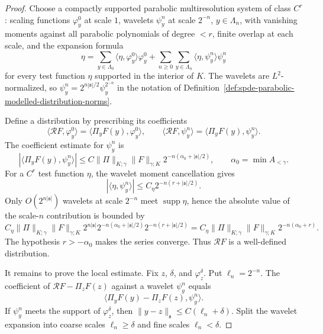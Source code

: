 \begin{proof}
Choose a compactly supported parabolic multiresolution system of class
\(C^r\): scaling functions \(\varphi_y^0\) at scale \(1\), wavelets
\(\psi_y^n\) at scale \(2^{-n}\), \(y\in\Lambda_n\), with vanishing moments
against all parabolic polynomials of degree \(<r\), finite overlap at each
scale, and the expansion formula
\[
  \eta
  =
  \sum_{y\in\Lambda_0}\langle\eta,\varphi_y^0\rangle\varphi_y^0
  +
  \sum_{n\geq0}\sum_{y\in\Lambda_n}
  \langle\eta,\psi_y^n\rangle\psi_y^n
\]
for every test function \(\eta\) supported in the interior of \(K\).  The
wavelets are \(L^2\)-normalized, so
\(\psi_y^n=2^{n|\mathfrak s|/2}\psi_y^{2^{-n}}\) in the notation of
Definition~\ref{def:spde-parabolic-modelled-distribution-norms}.

Define a distribution by prescribing its coefficients
\[
  \langle\mathcal RF,\varphi_y^0\rangle
  =
  \langle\Pi_yF(y),\varphi_y^0\rangle,\qquad
  \langle\mathcal RF,\psi_y^n\rangle
  =
  \langle\Pi_yF(y),\psi_y^n\rangle .
\]
The coefficient estimate for \(\psi_y^n\) is
\[
  |\langle\Pi_yF(y),\psi_y^n\rangle|
  \leq
  C\|\Pi\|_{K;\gamma}\|F\|_{\gamma;K}
  2^{-n(\alpha_0+|\mathfrak s|/2)},
  \qquad
  \alpha_0=\min A_{<\gamma}.
\]
For a \(C^r\) test function \(\eta\), the wavelet moment cancellation gives
\[
  |\langle\eta,\psi_y^n\rangle|
  \leq
  C_\eta 2^{-n(r+|\mathfrak s|/2)} .
\]
Only \(O(2^{n|\mathfrak s|})\) wavelets at scale \(2^{-n}\) meet
\(\operatorname{supp}\eta\), hence the absolute value of the scale-\(n\)
contribution is bounded by
\[
  C_\eta\|\Pi\|_{K;\gamma}\|F\|_{\gamma;K}
  2^{n|\mathfrak s|}
  2^{-n(\alpha_0+|\mathfrak s|/2)}
  2^{-n(r+|\mathfrak s|/2)}
  =
  C_\eta\|\Pi\|_{K;\gamma}\|F\|_{\gamma;K}2^{-n(\alpha_0+r)} .
\]
The hypothesis \(r>-\alpha_0\) makes the series converge.  Thus
\(\mathcal RF\) is a well-defined distribution.

It remains to prove the local estimate.  Fix \(z\), \(\delta\), and
\(\varphi_z^\delta\).  Put \(\ell_n=2^{-n}\).  The coefficient of
\(\mathcal RF-\Pi_zF(z)\) against a wavelet \(\psi_y^n\) equals
\[
  \langle\Pi_yF(y)-\Pi_zF(z),\psi_y^n\rangle .
\]
If \(\psi_y^n\) meets the support of \(\varphi_z^\delta\), then
\(\|y-z\|_{\mathfrak s}\leq C(\ell_n+\delta)\).  Split the wavelet expansion
into coarse scales \(\ell_n\geq\delta\) and fine scales \(\ell_n<\delta\).


\end{proof}
